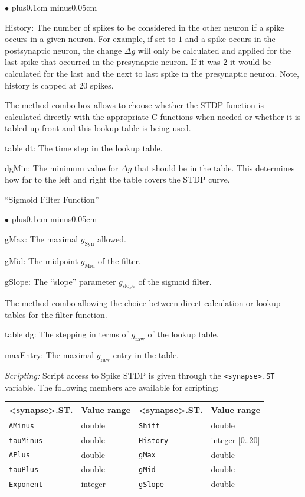 \documentclass{article}
\newenvironment{myitem}{\begin{list}{$\bullet$}{\setlength{\leftmargin}{1.1em}
\itemsep0.1cm plus0.1cm minus0.05cm
\listparindent0cm
\addtolength{\labelsep}{0.5\labelsep}
\setlength{\labelwidth}{0.8em}
\setlength{\leftmargin}{\labelwidth}
\addtolength{\leftmargin}{\labelsep}
}}{\end{list}}
\begin{document}
\begin{myitem}
\item History: The number of spikes to be considered in the other
  neuron if a spike occurs in a given neuron. For example, if set to
  $1$ and a spike occurs in the postsynaptic neuron, the change 
  $\Delta g$ will only be calculated and applied for the last spike
  that occurred in the presynaptic neuron. If it was $2$ it would be
  calculated for the last and the next to last spike in the
  presynaptic neuron. Note, history is capped at 20 spikes.
\item The method combo box allows to choose whether the STDP function is
  calculated directly with the appropriate C functions when needed or
  whether it is tabled up front and this lookup-table is being used.
\item table dt: The time step in the lookup table.
\item dgMin: The minimum value for $\Delta g$ that should be in the
  table. This determines how far to the left and right the table
  covers the STDP curve.
\end{myitem}
``Sigmoid Filter Function''
\begin{myitem}
\item gMax: The maximal $g_{\text{Syn}}$ allowed.
\item gMid: The midpoint $g_{\text{Mid}}$ of the filter.
\item gSlope: The ``slope'' parameter $g_{\text{slope}}$ of the sigmoid filter. 
\item The method combo allowing the choice between direct calculation
  or lookup tables for the filter function.
\item table dg: The stepping in terms of $g_{\text{raw}}$ of the
  lookup table.
\item maxEntry: The maximal $g_{\text{raw}}$ entry in the table.
\end{myitem}

\noindent
\emph{Scripting:} Script access to Spike STDP is given through the \texttt{<synapse>.ST} variable.
The following members are available for scripting: \\
\begin{tabular}[b]{|ll|ll|}
	\hline
	{\bf \textless{}synapse\textgreater.ST.\textvisiblespace} & {\bf Value range} 
	& {\bf \textless{}synapse\textgreater.ST.\textvisiblespace} & {\bf Value range} \\
	\hline
	\texttt{AMinus} & double 	& \texttt{Shift} & double \\
	\texttt{tauMinus} & double 	& \texttt{History} & integer [0..20] \\
	\texttt{APlus} & double 	& \texttt{gMax} & double \\
	\texttt{tauPlus} & double & \texttt{gMid} & double \\
	\texttt{Exponent} & integer & \texttt{gSlope} & double \\
	\hline
\end{tabular}
\end{document}
